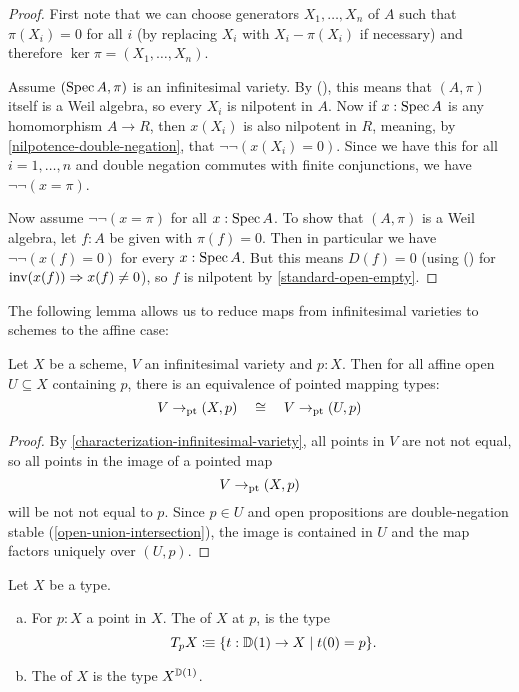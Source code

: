 \begin{proof}
  First note that we can choose generators
  $X_1,\ldots,X_n$ of $A$
  such that $\pi(X_i) = 0$ for all $i$
  (by replacing $X_i$ with $X_i - \pi(X_i)$ if necessary)
  and therefore $\ker \pi = (X_1, \dots, X_n)$.

  Assume $(\operatorname{Spec} A, \pi)$ is an infinitesimal variety.
  By (), this means that $(A, \pi)$ itself is a Weil algebra,
  so every $X_i$ is nilpotent in $A$.
  Now if $x : \operatorname{Spec} A$ is any homomorphism $A \to R$,
  then $x(X_i)$ is also nilpotent in $R$,
  meaning, by \cref{nilpotence-double-negation}, that $\lnot \lnot (x(X_i) = 0)$.
  Since we have this for all $i = 1, \dots, n$
  and double negation commutes with finite conjunctions,
  we have $\lnot \lnot (x = \pi)$.

  Now assume $\lnot \lnot (x = \pi)$ for all $x : \operatorname{Spec} A$.
  To show that $(A, \pi)$ is a Weil algebra,
  let $f : A$ be given with $\pi(f) = 0$.
  Then in particular we have $\lnot \lnot (x(f) = 0)$
  for every $x : \operatorname{Spec} A$.
  But this means $D(f) = 0$
  (using () for $\mathrm{inv}(x(f)) \Rightarrow x(f) \neq 0$),
  so $f$ is nilpotent by \cref{standard-open-empty}.
\end{proof}

The following lemma allows us to reduce
maps from infinitesimal varieties to schemes
to the affine case:

\begin{lemma}%
  \label{affine-opens-infinitesimal-closed}
  Let $X$ be a scheme, $V$ an infinitesimal variety and $p:X$.
  Then for all affine open $U\subseteq X$
  containing $p$, there is an equivalence
  of pointed mapping types:
  \[ V\to_{\mathrm{pt}}  (X, p) \quad\cong\quad V\to_{\mathrm{pt}}  (U, p) \]
\end{lemma}

\begin{proof}
  By \cref{characterization-infinitesimal-variety},
  all points in $V$ are not not equal,
  so all points in the image of a pointed map
  \[ V \to_{\mathrm{pt}}  (X, p) \]
  will be not not equal to $p$.
  Since $p \in U$ and open propositions are double-negation stable
  (\cref{open-union-intersection}),
  the image is contained in $U$
  and the map factors uniquely over $(U, p)$.
\end{proof}

\begin{definition}
  Let $X$ be a type.
  \begin{enumerate}[(a)]
  \item For $p:X$ a point in $X$.
    The  of $X$ at $p$, is the type
    \[ T_p X \colonequiv \{ t : \D(1) \to X \mid t(0)=p \}\rlap{.}\]
  \item The  of $X$ is the type $X^{\mathbb{D}(1)}$.
  \end{enumerate}
\end{definition}

